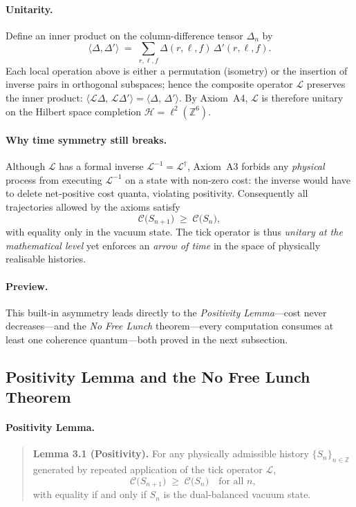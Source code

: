 \documentclass[11pt]{article}
\begin{document}
\paragraph{Unitarity.}
Define an inner product on the column-difference
tensor \(\Delta_{n}\) by
\[
\langle \Delta,\Delta'\rangle
\;=\;
\sum_{r,\ell,f} \Delta(r,\ell,f)\,\Delta'(r,\ell,f).
\]
Each local operation above is either a permutation (isometry) or the
insertion of inverse pairs in orthogonal subspaces; hence the composite
operator \(\mathcal{L}\) preserves the inner product:
\(\langle \mathcal{L}\Delta,\,\mathcal{L}\Delta'\rangle
 = \langle \Delta,\,\Delta'\rangle\).
By Axiom~A4, \(\mathcal{L}\) is therefore unitary on the Hilbert space
completion \(\mathcal{H}=\ell^{2}(\mathbb{Z}^{6})\).

\paragraph{Why time symmetry still breaks.}
Although \(\mathcal{L}\) has a formal inverse
\(\mathcal{L}^{-1}=\mathcal{L}^{\dagger}\),
Axiom~A3 forbids any \emph{physical} process from executing
\(\mathcal{L}^{-1}\) on a state with non-zero cost: the inverse would
have to delete net‐positive cost quanta, violating positivity.
Consequently all trajectories allowed by the axioms satisfy
\[
\mathcal{C}\!\bigl(S_{n+1}\bigr)
    \;\ge\;
\mathcal{C}\!\bigl(S_{n}\bigr),
\]
with equality only in the vacuum state.  The tick operator is thus
\emph{unitary at the mathematical level} yet enforces an
\emph{arrow of time} in the space of physically realisable histories.

\paragraph{Preview.}
This built-in asymmetry leads directly to the
\textit{Positivity Lemma}—cost never decreases—and the
\textit{No Free Lunch} theorem—every computation consumes at least one
coherence quantum—both proved in the next subsection.

\subsection{Positivity Lemma and the No Free Lunch Theorem}
\label{subsec:positivity-nfl}

\paragraph{Positivity Lemma.}
\begin{quote}
\textbf{Lemma 3.1 (Positivity).}  
For any physically admissible history \(\{S_{n}\}_{n\in\mathbb{Z}}\) generated by repeated application of the tick operator \(\mathcal{L}\),
\[
\mathcal{C}\!\bigl(S_{n+1}\bigr) \;\ge\; \mathcal{C}\!\bigl(S_{n}\bigr)
\quad\text{for all } n,
\]
with equality if and only if \(S_{n}\) is the dual-balanced vacuum state.
\end{quote}
\end{document}
